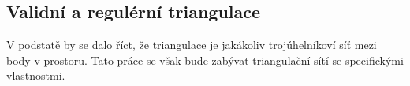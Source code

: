\documentclass[12pt,a4paper]{article}
\begin{document}
\begin{figure}[h!]
\centering
\begin{floatrow}
\end{floatrow}
\end{figure}

\newpage
\subsection{Validní a regulérní triangulace}
V podstatě by se dalo říct, že triangulace je jakákoliv trojúhelníkoví síť mezi body v prostoru. Tato práce se však bude zabývat triangulační sítí se specifickými vlastnostmi.
\end{document}
